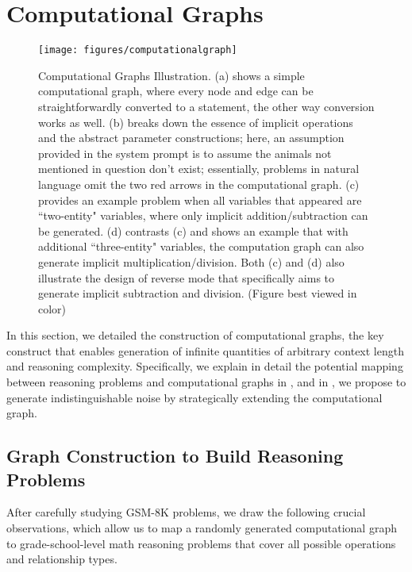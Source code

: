 \section{Computational Graphs} 

\begin{figure*}
    \texttt{[image: figures/computationalgraph]} 
    \caption{Computational Graphs Illustration. (a) shows a simple computational graph, where every node and edge can be straightforwardly converted to a statement, the other way conversion works as well. (b) breaks down the essence of implicit operations and the abstract parameter constructions; here, an assumption provided in the system prompt is to assume the animals not mentioned in question don't exist; essentially, problems in natural language omit the two red arrows in the computational graph. (c) provides an example problem when all variables that appeared are ``two-entity" variables, where only implicit addition/subtraction can be generated. (d) contrasts (c) and shows an example that with additional ``three-entity" variables, the computation graph can also generate implicit multiplication/division. Both (c) and (d) also illustrate the design of reverse mode that specifically aims to generate implicit subtraction and division. (Figure best viewed in color)} 
    \label{mediumhard} 
\end{figure*} 

In this section, we detailed the construction of computational graphs, the key construct that enables \sysb generation of infinite quantities of arbitrary context length and reasoning complexity. Specifically, we explain in detail the potential mapping between reasoning problems and computational graphs in , and in , we propose to generate indistinguishable noise by strategically extending the computational graph. 

\subsection{Graph Construction to Build Reasoning Problems} 
\label{sec:graphtoreasoning}
After carefully studying GSM-8K problems, we draw the following crucial observations, which allow us to map a randomly generated computational graph to grade-school-level math reasoning problems that cover all possible operations and relationship types. 

